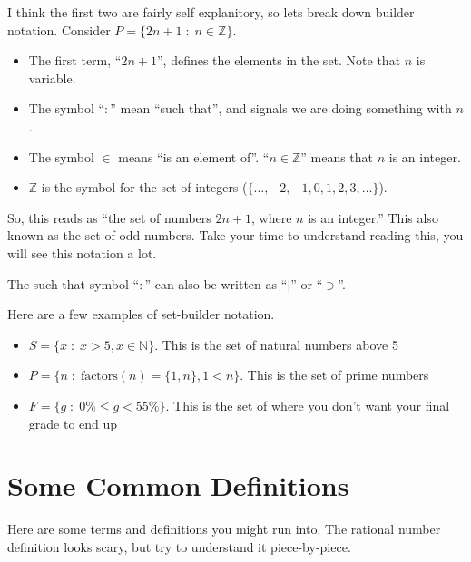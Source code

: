 I think the first two are fairly self explanitory, so lets break down builder notation. Consider $P = \{2n+1\;:\;n \in \mathbb{Z}\}$.

\begin{itemize}
	\item The first term, ``$2n+1$'', defines the elements in the set. Note that $n$ is variable.
	\item The symbol ``$:$'' mean ``such that'', and signals we are doing something with $n$.
	\item The symbol $\in$ means ``is an element of''. ``$n \in \mathbb{Z}$'' means that $n$ is an integer.
	\item $\mathbb{Z}$ is the symbol for the set of integers ($\{\dots,-2,-1,0,1,2,3,\dots\}$).
\end{itemize}

So, this reads as ``the set of numbers $2n+1$, where $n$ is an integer.'' This also known as the set of odd numbers. Take your time to understand reading this, you will see this notation a lot.

\begin{boxnotation*}{}{}
	The such-that symbol ``$:$'' can also be written as ``$|$'' or ``$\ni$''.
\end{boxnotation*}

\begin{boxexample}{}{}
	Here are a few examples of set-builder notation.

	\begin{itemize}
		\item $S = \{x \;:\; x > 5, x \in \mathbb{N}\}$. This is the set of natural numbers above 5
		\item $P = \{n \;:\; \text{factors}(n) = \{1,n\}, 1 < n\}$. This is the set of prime numbers
		\item $F = \{g \;:\; 0\% \leq g < 55\%\}$. This is the set of where you don't want your final grade to end up
	\end{itemize}
\end{boxexample}
	
\section{Some Common Definitions}

Here are some terms and definitions you might run into. The rational number definition looks scary, but try to understand it piece-by-piece.

